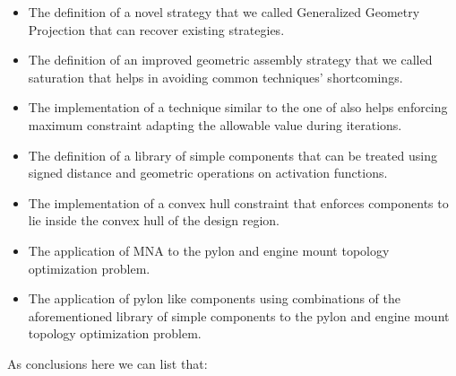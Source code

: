 \begin{itemize}
\item The definition of a novel strategy that we called Generalized Geometry Projection that can recover existing strategies.
\item The definition of an improved geometric assembly strategy that we called saturation that helps in avoiding common techniques' shortcomings.
\item The implementation of a technique similar to the one of \cite{le2010stress} also helps enforcing maximum constraint adapting the allowable value during iterations. 
\item The definition of a library of simple components that can be treated using signed distance and geometric operations on activation functions.
\item The implementation of a convex hull constraint that enforces components to lie inside the convex hull of the design region.
\item The application of MNA to the pylon and engine mount topology optimization problem.
\item The application of pylon like components using combinations of the aforementioned library of simple components to the pylon and engine mount topology optimization problem.
\end{itemize}
As conclusions here we can list that:

